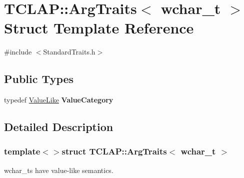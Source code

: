 \hypertarget{struct_t_c_l_a_p_1_1_arg_traits_3_01wchar__t_01_4}{\section{T\+C\+L\+A\+P\+:\+:Arg\+Traits$<$ wchar\+\_\+t $>$ Struct Template Reference}
\label{struct_t_c_l_a_p_1_1_arg_traits_3_01wchar__t_01_4}
}


{\ttfamily \#include $<$Standard\+Traits.\+h$>$}

\subsection*{Public Types}
\begin{DoxyCompactItemize}
\item 
\hypertarget{struct_t_c_l_a_p_1_1_arg_traits_3_01wchar__t_01_4_a49a311297a394637af4d8d64eda7f442}{typedef \hyperlink{struct_t_c_l_a_p_1_1_value_like}{Value\+Like} {\bfseries Value\+Category}}\label{struct_t_c_l_a_p_1_1_arg_traits_3_01wchar__t_01_4_a49a311297a394637af4d8d64eda7f442}

\end{DoxyCompactItemize}


\subsection{Detailed Description}
\subsubsection*{template$<$$>$struct T\+C\+L\+A\+P\+::\+Arg\+Traits$<$ wchar\+\_\+t $>$}

wchar\+\_\+ts have value-\/like semantics. 